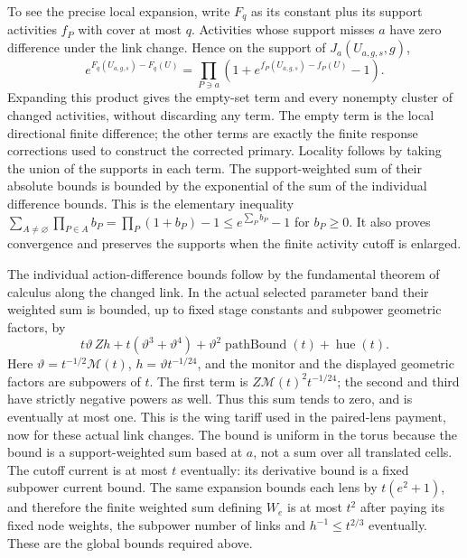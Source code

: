 To see the precise local expansion, write $F_q$ as its constant plus
its support activities $f_P$ with cover at most $q$. Activities whose
support misses $a$ have zero difference under the link change. Hence
on the support of $J_a(U_{a,g,s},g)$,
\[
 e^{F_q(U_{a,g,s})-F_q(U)}
 =\prod_{P\ni a}\left(1+
       e^{f_P(U_{a,g,s})-f_P(U)}-1\right).
\]
Expanding this product gives the empty-set term and every nonempty
cluster of changed activities, without discarding any term. The empty
term is the local directional finite difference; the other terms are
exactly the finite response corrections used to construct the corrected
primary. Locality follows by taking the union of the supports in each
term. The support-weighted sum of their absolute bounds is bounded by
the exponential of the sum of the individual difference bounds. This
is the elementary inequality
$\sum_{A\ne\varnothing}\prod_{P\in A}b_P
=\prod_P(1+b_P)-1\le e^{\sum_P b_P}-1$ for $b_P\ge0$.
It also proves convergence and preserves the supports when the finite
activity cutoff is enlarged.

The individual action-difference bounds follow by the fundamental theorem
of calculus along the changed link. In the actual selected parameter
band their weighted sum is bounded, up to fixed stage constants and
subpower geometric factors, by
\[
 t\vartheta\,Zh+t(\vartheta^3+\vartheta^4)
            +\vartheta^2\operatorname{pathBound}(t)
            +\operatorname{hue}(t).
\]
Here $\vartheta=t^{-1/2}\mathcal M(t)$, $h=\vartheta t^{-1/24}$,
and the monitor and the displayed geometric factors are subpowers of
$t$. The first term is $Z\mathcal M(t)^2t^{-1/24}$;
the second and third have strictly negative powers as well. Thus this
sum tends to zero, and is eventually at most one. This is the wing
tariff used in the paired-lens payment, now for these actual link changes.
The bound is uniform in the torus because the bound is a support-weighted
sum based at $a$, not a sum over all translated cells.
The cutoff current is at most $t$ eventually: its derivative bound is a
fixed subpower current bound. The same expansion bounds each lens by
$t(e^2+1)$, and therefore the finite weighted sum defining $W_e$ is
at most $t^2$ after paying its fixed node weights, the subpower number
of links and $h^{-1}\le t^{2/3}$ eventually. These are the global bounds required above.

